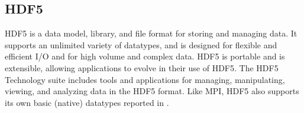 \documentclass{../../template/esiwace-report}
\begin{document}
\subsection{HDF5}


HDF5 is a data model, library, and file format for storing and managing data. It supports an unlimited variety of datatypes, and is designed for flexible and efficient I/O and for high volume and complex data. HDF5 is portable and is extensible, allowing applications to evolve in their use of HDF5. The HDF5 Technology suite includes tools and applications for managing, manipulating, viewing, and analyzing data in the HDF5 format. Like MPI, HDF5 also supports its own basic (native) datatypes reported in .
\end{document}
